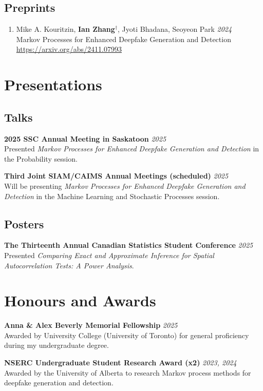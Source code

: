 \documentclass[11pt]{article}
\theoremstyle{definition}
\newcommand{\1}{\mathds 1}
\begin{document}
\subsection*{Preprints}
\begin{enumerate}
    \item Mike A. Kouritzin, \textbf{Ian Zhang}$^\dag$, Jyoti Bhadana, Seoyeon Park \hfill \textit{2024}\\
    Markov Processes for Enhanced Deepfake Generation and Detection \\
    \url{https://arxiv.org/abs/2411.07993}
\end{enumerate}

\section*{Presentations}
\subsection*{Talks}
\textbf{2025 SSC Annual Meeting in Saskatoon} \hfill \textit{2025}\\
Presented \textit{Markov Processes for Enhanced Deepfake Generation and Detection} in the Probability session. 

\textbf{Third Joint SIAM/CAIMS Annual Meetings (scheduled)} \hfill \textit{2025}\\
Will be presenting \textit{Markov Processes for Enhanced Deepfake Generation and Detection} in the Machine Learning and Stochastic Processes session.

\subsection*{Posters}
\textbf{The Thirteenth Annual Canadian Statistics Student Conference} \hfill \textit{2025}\\
Presented \textit{Comparing Exact and Approximate Inference for Spatial Autocorrelation Tests: A Power Analysis}.

\section*{Honours and Awards}
\textbf{Anna \& Alex Beverly Memorial Fellowship} \hfill \textit{2025}\\
Awarded by University College (University of Toronto) for general proficiency during my undergraduate degree.

\textbf{NSERC Undergraduate Student Research Award (x2)} \hfill \textit{2023, 2024}\\
Awarded by the University of Alberta to research Markov process methods for deepfake generation and detection. 
\end{document}
